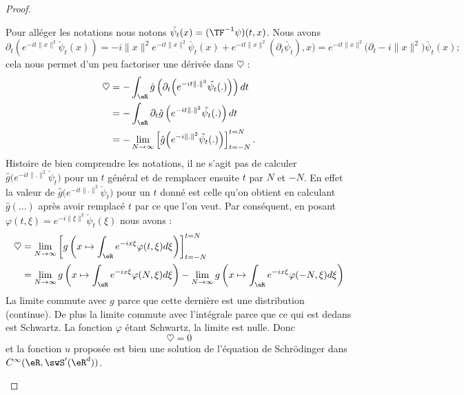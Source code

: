 \begin{proof}
\begin{subproof}
        Pour alléger les notations nous notons \( \check{\psi_t}(x)=(\TF^{-1}\psi)(t,x)\). Nous avons
        \begin{equation}
            \partial_t\left(  e^{-it\| x \|^2}\check\psi_t(x) \right)=-i\| x \|^2 e^{-it\| x \|^2}\check{\psi_t}(x)+ e^{-it\| x \|^2}(\partial_t\check{\psi_t}),x)= e^{-it\| x \|^2}\big( \partial_t-i\| x \|^2 \big)\check{\psi_t}(x);
        \end{equation}
        cela nous permet d'un peu factoriser une dérivée dans \( \heartsuit\) :
        \begin{subequations}
            \begin{align}
                \heartsuit&=-\int_{\eR}\hat g\left( \partial_t\Big(  e^{-it\| . \|^2}\check{\psi_t}(.) \Big) \right)dt\\
                &=-\int_{\eR}\partial_t\hat g\left(  e^{-it\| . \|^2}\check{\psi_t}(.) \right)dt\\
                &=-\lim_{N\to \infty} \left[ \hat g\Big(  e^{-i\| . \|^2}\check{\psi_t}(.) \Big) \right]_{t=-N}^{t=N}.
            \end{align}
        \end{subequations}
        Histoire de bien comprendre les notations, il ne s'agit pas de calculer \( \hat g\big(  e^{-it\| . \|^2}\check\psi_t \big)\) pour un \( t\) général et de remplacer ensuite \( t\) par \( N\) et \( -N\). En effet la valeur de \( \hat g\big(  e^{-it\| . \|^2}\check\psi_t \big)\) pour un \( t\) donné est celle qu'on obtient en calculant \( \hat g(\ldots)\) après avoir remplacé \( t\) par ce que l'on veut. Par conséquent, en posant \( \varphi(t,\xi)= e^{-i\| \xi \|^2}\check\psi_t(\xi)\) nous avons :
        \begin{subequations}
            \begin{align}
                \heartsuit&=\lim_{N\to \infty} \left[ g\left( x\mapsto\int_{\eR} e^{-ix\xi}\varphi(t,\xi )d\xi \right) \right]_{t=-N}^{t=N}\\
                &=\lim_{N\to \infty} g\left( x\mapsto\int_{\eR} e^{-ix\xi}\varphi(N,\xi )d\xi \right)-\lim_{N\to \infty} g\left( x\mapsto\int_{\eR} e^{-ix\xi}\varphi(-N,\xi )d\xi \right)
            \end{align}
        \end{subequations}
        La limite commute avec \( g\) parce que cette dernière est une distribution (continue). De plus la limite commute avec l'intégrale parce que ce qui est dedans est Schwartz. La fonction \( \varphi\) étant Schwartz, la limite est nulle. Donc
        \begin{equation}
            \heartsuit=0
        \end{equation}
        et la fonction \( u\) proposée est bien une solution de l'équation de Schrödinger dans \(  C^{\infty}(\eR,\swS'(\eR^d))\).


\end{subproof}
\end{proof}
